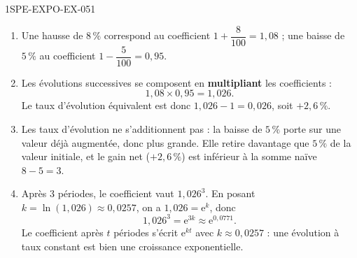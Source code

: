 \begin{corrige}{1SPE-EXPO-EX-051}
\begin{enumerate}
\item Une hausse de $8\,\%$ correspond au coefficient $1 + \dfrac{8}{100} = 1{,}08$ ;
  une baisse de $5\,\%$ au coefficient $1 - \dfrac{5}{100} = 0{,}95$.

\item Les évolutions successives se composent en \textbf{multipliant} les
  coefficients :
  \[
    1{,}08 \times 0{,}95 = 1{,}026.
  \]
  Le taux d'évolution équivalent est donc $1{,}026 - 1 = 0{,}026$, soit
  $+2{,}6\,\%$.

\item Les taux d'évolution ne s'additionnent pas : la baisse de $5\,\%$ porte
  sur une valeur déjà augmentée, donc plus grande. Elle retire davantage que
  $5\,\%$ de la valeur initiale, et le gain net ($+2{,}6\,\%$) est inférieur à
  la somme naïve $8 - 5 = 3$.

\item Après $3$ périodes, le coefficient vaut $1{,}026^3$. En posant
  $k = \ln(1{,}026) \approx 0{,}0257$, on a $1{,}026 = \mathrm{e}^{k}$, donc
  \[
    1{,}026^3 = \mathrm{e}^{3k} \approx \mathrm{e}^{0{,}0771}.
  \]
  Le coefficient après $t$ périodes s'écrit $\mathrm{e}^{kt}$ avec
  $k \approx 0{,}0257$ : une évolution à taux constant est bien une croissance
  exponentielle.
\end{enumerate}
\end{corrige}
